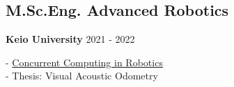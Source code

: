 \subsection{M.Sc.Eng. Advanced Robotics}

\textbf{Keio University} \hfill 
{\footnotesize 2021 - 2022} \\
{
    \raggedright
    -
    \href{https://www.linkedin.com/in/andreu-gimenez/overlay/education/733808829/multiple-media-viewer/?treasuryMediaId=1635488056423}{Concurrent
    Computing in Robotics} \\
    - Thesis: Visual Acoustic Odometry \\
}